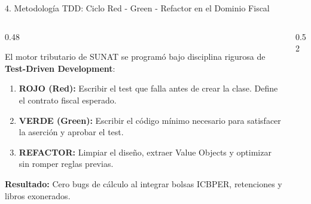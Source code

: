 \documentclass[aspectratio=169,10pt]{beamer}
\begin{document}
\begin{frame}{4. Metodología TDD: Ciclo Red - Green - Refactor en el Dominio Fiscal}
\begin{columns}
\begin{column}{0.48\textwidth}
    \begin{tcolorbox}[colback=cardbg, colframe=cardbg, title=\color{accentred}\bfseries ¿Cómo construimos el núcleo con TDD?]
        El motor tributario de SUNAT se programó bajo disciplina rigurosa de \textbf{Test-Driven Development}:
        \begin{enumerate}
            \item \textbf{ROJO (Red):} Escribir el test que falla antes de crear la clase. Define el contrato fiscal esperado.
            \item \textbf{VERDE (Green):} Escribir el código mínimo necesario para satisfacer la aserción y aprobar el test.
            \item \textbf{REFACTOR:} Limpiar el diseño, extraer Value Objects y optimizar sin romper reglas previas.
        \end{enumerate}
        \vspace{0.05cm}
        \textbf{Resultado:} Cero bugs de cálculo al integrar bolsas ICBPER, retenciones y libros exonerados.
    \end{tcolorbox}
\end{column}
\begin{column}{0.52\textwidth}
    \begin{center}
\end{center}
\end{column}
\end{columns}
\end{frame}
\end{document}
